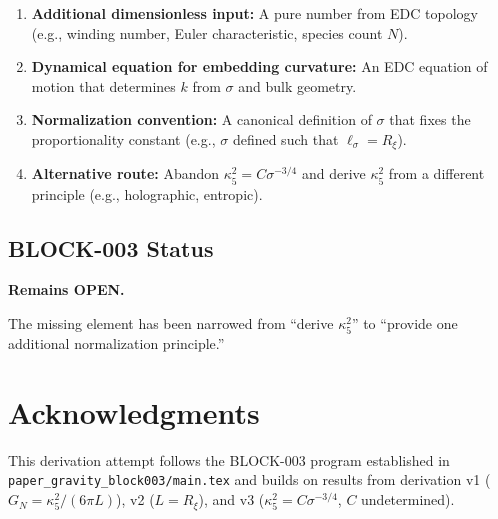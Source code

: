 \documentclass[11pt,a4paper]{article}
\theoremstyle{definition}
\begin{document}
\begin{enumerate}
\item \textbf{Additional dimensionless input:} A pure number from EDC topology
(e.g., winding number, Euler characteristic, species count $N$).

\item \textbf{Dynamical equation for embedding curvature:} An EDC equation of motion
that determines $k$ from $\sigma$ and bulk geometry.

\item \textbf{Normalization convention:} A canonical definition of $\sigma$ that
fixes the proportionality constant (e.g., $\sigma$ defined such that $\ell_\sigma = R_\xi$).

\item \textbf{Alternative route:} Abandon $\kappa_5^2 = C\sigma^{-3/4}$ and derive
$\kappa_5^2$ from a different principle (e.g., holographic, entropic).
\end{enumerate}

\subsection{BLOCK-003 Status}

\textbf{Remains OPEN.}

The missing element has been narrowed from ``derive $\kappa_5^2$'' to
``provide one additional normalization principle.''

\section*{Acknowledgments}

This derivation attempt follows the BLOCK-003 program established in
\texttt{paper\_gravity\_block003/main.tex} and builds on results from
derivation v1 ($G_N = \kappa_5^2/(6\pi L)$), v2 ($L = R_\xi$), and
v3 ($\kappa_5^2 = C\sigma^{-3/4}$, $C$ undetermined).
\end{document}
